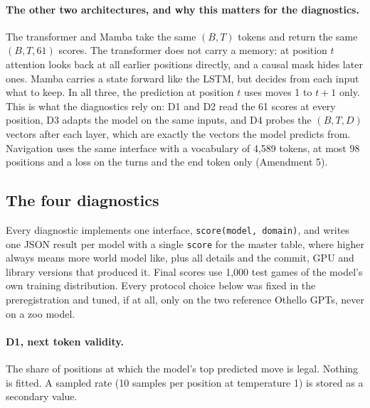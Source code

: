 \documentclass[11pt]{scrartcl}
\begin{document}
\paragraph{The other two architectures, and why this matters for the diagnostics.} The transformer and Mamba
take the same $(B, T)$ tokens and return the same $(B, T, 61)$ scores. The transformer does not carry a memory:
at position $t$ attention looks back at all earlier positions directly, and a causal mask hides later ones.
Mamba carries a state forward like the LSTM, but decides from each input what to keep. In all three, the
prediction at position $t$ uses moves 1 to $t+1$ only. This is what the diagnostics rely on: D1 and D2 read
the 61 scores at every position, D3 adapts the model on the same inputs, and D4 probes the $(B, T, D)$ vectors
after each layer, which are exactly the vectors the model predicts from. Navigation uses the same interface
with a vocabulary of 4,589 tokens, at most 98 positions and a loss on the turns and the end token only
(Amendment 5).

\subsection{The four diagnostics}
\label{sec:diagnostics}

Every diagnostic implements one interface, \texttt{score(model, domain)}, and writes one JSON result per model
with a single \texttt{score} for the master table, where higher always means more world model like, plus all
details and the commit, GPU and library versions that produced it. Final scores use 1,000 test games of the
model's own training distribution. Every protocol choice below was fixed in the preregistration and tuned, if
at all, only on the two reference Othello GPTs, never on a zoo model.

\paragraph{D1, next token validity.} The share of positions at which the model's top predicted move is legal.
Nothing is fitted. A sampled rate (10 samples per position at temperature 1) is stored as a secondary value.
\end{document}
